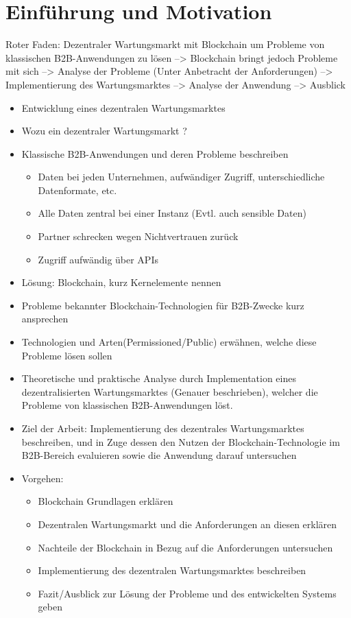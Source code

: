 \chapter{Einführung und Motivation}
\label{cha:einfuehrung}

Roter Faden: Dezentraler Wartungsmarkt mit Blockchain um Probleme von klassischen B2B-Anwendungen zu lösen --> Blockchain bringt jedoch Probleme mit sich --> Analyse der Probleme (Unter Anbetracht der Anforderungen) --> Implementierung des Wartungsmarktes --> Analyse der Anwendung --> Ausblick 


\begin{itemize}
    \item Entwicklung eines dezentralen Wartungsmarktes
    \item Wozu ein dezentraler Wartungsmarkt ? 
    \item Klassische B2B-Anwendungen und deren Probleme beschreiben  
     \begin{itemize}
      \item Daten bei jeden Unternehmen, aufwändiger Zugriff, unterschiedliche Datenformate, etc.
      \item Alle Daten zentral bei einer Instanz (Evtl. auch sensible Daten)
      \item Partner schrecken wegen Nichtvertrauen zurück
      \item Zugriff aufwändig über APIs
    \end{itemize}
    \item Lösung: Blockchain, kurz Kernelemente nennen
    \item Probleme bekannter Blockchain-Technologien für B2B-Zwecke kurz ansprechen
    \item Technologien und Arten(Permissioned/Public) erwähnen, welche diese Probleme lösen sollen
    \item Theoretische und praktische Analyse durch Implementation eines dezentralisierten Wartungsmarktes (Genauer beschrieben), welcher die Probleme von klassischen B2B-Anwendungen löst.
    \item Ziel der Arbeit: Implementierung des dezentrales Wartungsmarktes beschreiben, und in Zuge dessen den Nutzen der Blockchain-Technologie im B2B-Bereich evaluieren sowie die Anwendung darauf untersuchen
    \item Vorgehen:
    \begin{itemize}
      \item Blockchain Grundlagen erklären
      \item Dezentralen Wartungsmarkt und die Anforderungen an diesen erklären
      \item Nachteile der Blockchain in Bezug auf die Anforderungen untersuchen 
      \item Implementierung des dezentralen Wartungsmarktes beschreiben
      \item Fazit/Ausblick zur Lösung der Probleme und des entwickelten Systems geben
    \end{itemize}
  \end{itemize}

  \cite{WustyouneedBlockchain2017}
